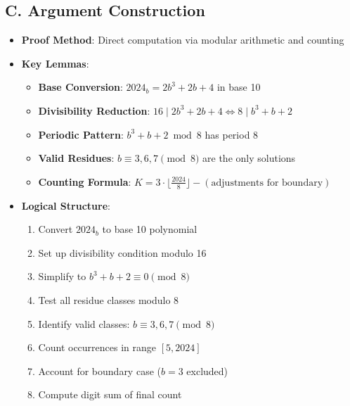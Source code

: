 \documentclass[11pt]{article}
\begin{document}
\begin{strategicbox}
\subsection*{C. Argument Construction}
\begin{itemize}[leftmargin=*]
    \item \textbf{Proof Method}: Direct computation via modular arithmetic and counting
    
    \item \textbf{Key Lemmas}: 
    \begin{itemize}
        \item \textbf{Base Conversion}: $2024_b = 2b^3 + 2b + 4$ in base 10
        \item \textbf{Divisibility Reduction}: $16 \mid 2b^3 + 2b + 4 \iff 8 \mid b^3 + b + 2$
        \item \textbf{Periodic Pattern}: $b^3 + b + 2 \bmod 8$ has period 8
        \item \textbf{Valid Residues}: $b \equiv 3, 6, 7 \pmod{8}$ are the only solutions
        \item \textbf{Counting Formula}: $K = 3 \cdot \lfloor \frac{2024}{8} \rfloor - (\text{adjustments for boundary})$
    \end{itemize}
    
    \item \textbf{Logical Structure}: 
    \begin{enumerate}
        \item Convert $2024_b$ to base 10 polynomial
        \item Set up divisibility condition modulo 16
        \item Simplify to $b^3 + b + 2 \equiv 0 \pmod{8}$
        \item Test all residue classes modulo 8
        \item Identify valid classes: $b \equiv 3, 6, 7 \pmod{8}$
        \item Count occurrences in range $[5, 2024]$
        \item Account for boundary case ($b = 3$ excluded)
        \item Compute digit sum of final count
    \end{enumerate}
\end{itemize}
\end{strategicbox}
\end{document}
